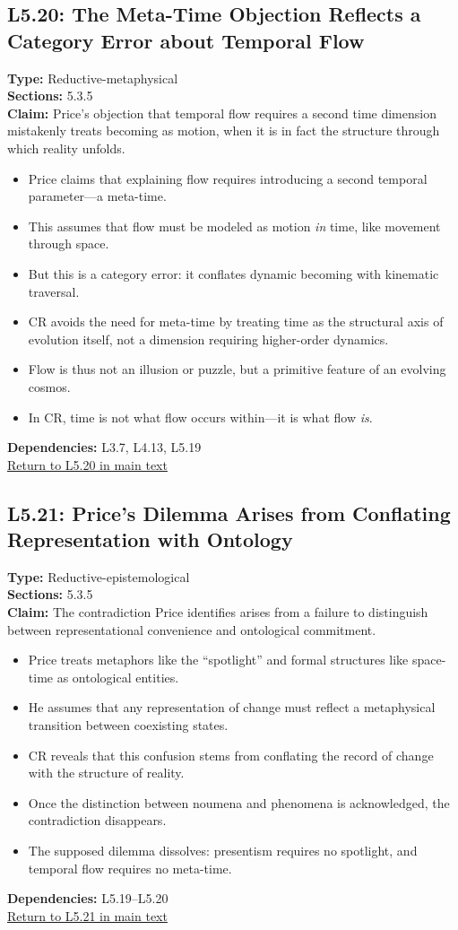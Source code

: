 \documentclass[12pt]{book}
\newcommand{\returnlink}[1]{\hyperref[logic:#1]{Return to #1 in main text}\xspace}
\begin{document}
\subsection*{L5.20: The Meta-Time Objection Reflects a Category Error about Temporal Flow}
\label{appendix:L5.20}
\textbf{Type:} Reductive-metaphysical \\
\textbf{Sections:} 5.3.5 \\
\textbf{Claim:} Price's objection that temporal flow requires a second time dimension mistakenly treats becoming as motion, when it is in fact the structure through which reality unfolds.
\begin{itemize}
  \item Price claims that explaining flow requires introducing a second temporal parameter---a meta-time.
  \item This assumes that flow must be modeled as motion \textit{in} time, like movement through space.
  \item But this is a category error: it conflates dynamic becoming with kinematic traversal.
  \item CR avoids the need for meta-time by treating time as the structural axis of evolution itself, not a dimension requiring higher-order dynamics.
  \item Flow is thus not an illusion or puzzle, but a primitive feature of an evolving cosmos.
  \item In CR, time is not what flow occurs within---it is what flow \textit{is}.
\end{itemize}
\textbf{Dependencies:} L3.7, L4.13, L5.19 \\
\returnlink{L5.20}

\subsection*{L5.21: Price's Dilemma Arises from Conflating Representation with Ontology}
\label{appendix:L5.21}
\textbf{Type:} Reductive-epistemological \\
\textbf{Sections:} 5.3.5 \\
\textbf{Claim:} The contradiction Price identifies arises from a failure to distinguish between representational convenience and ontological commitment.
\begin{itemize}
  \item Price treats metaphors like the ``spotlight'' and formal structures like space-time as ontological entities.
  \item He assumes that any representation of change must reflect a metaphysical transition between coexisting states.
  \item CR reveals that this confusion stems from conflating the record of change with the structure of reality.
  \item Once the distinction between noumena and phenomena is acknowledged, the contradiction disappears.
  \item The supposed dilemma dissolves: presentism requires no spotlight, and temporal flow requires no meta-time.
\end{itemize}
\textbf{Dependencies:} L5.19–L5.20 \\
\returnlink{L5.21}
\end{document}
